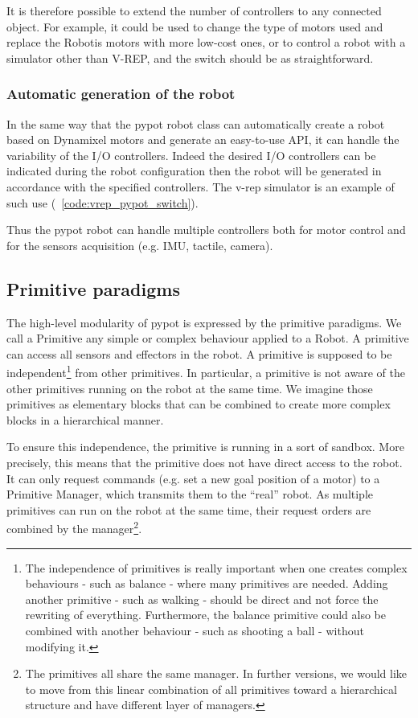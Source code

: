 It is therefore possible to extend the number of controllers to any connected object. For example, it could be used to change the type of motors used and replace the Robotis motors with more low-cost ones, or to control a robot with a simulator other than V-REP, and the switch should be as straightforward.




\subsubsection{Automatic generation of the robot} %
In the same way that the pypot robot class can automatically create a robot based on Dynamixel motors and generate an easy-to-use API, it can handle the variability of the I/O controllers. Indeed the desired I/O controllers can be indicated during the robot configuration then the robot will be generated in accordance with the specified controllers. The v-rep simulator is an example of such use (\codename~\ref{code:vrep_pypot_switch}).

Thus the pypot robot can handle multiple controllers both for motor control and for the sensors acquisition (e.g. IMU, tactile, camera).


\subsection{Primitive paradigms} %
\label{sub:primitive-paradigms}

The high-level modularity of pypot is expressed by the primitive paradigms. We call a Primitive any simple or complex behaviour applied to a Robot. A primitive can access all sensors and effectors in the robot. A primitive is supposed to be independent\footnote{The independence of primitives is really important when one creates complex behaviours - such as balance - where many primitives are needed. Adding another primitive - such as walking - should be direct and not force the rewriting of everything. Furthermore, the balance primitive could also be combined with another behaviour - such as shooting a ball - without modifying it.} from other primitives. In particular, a primitive is not aware of the other primitives running on the robot at the same time. We imagine those primitives as elementary blocks that can be combined to create more complex blocks in a hierarchical manner.

To ensure this independence, the primitive is running in a sort of sandbox. More precisely, this means that the primitive does not have direct access to the robot. It can only request commands (e.g. set a new goal position of a motor) to a Primitive Manager, which transmits them to the “real” robot. As multiple primitives can run on the robot at the same time, their request orders are combined by the manager\footnote{The primitives all share the same manager. In further versions, we would like to move from this linear combination of all primitives toward a hierarchical structure and have different layer of managers.}.

